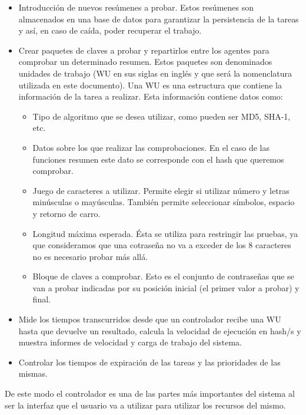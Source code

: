 \begin{itemize}
	\item Introducción de nuevos resúmenes a probar. Estos resúmenes son almacenados en una base de datos para garantizar la persistencia de la tareas y así, en caso de caída, poder recuperar el trabajo.

	\item Crear paquetes de claves a probar y repartirlos entre los agentes para comprobar un determinado resumen. Estos paquetes son denominados unidades de trabajo (WU en sus siglas en inglés y que será la nomenclatura utilizada en este documento). Una WU es una estructura que contiene la información de la tarea a realizar. Esta información contiene datos como:

	\begin{itemize}
		\item Tipo de algoritmo que se desea utilizar, como pueden ser MD5, SHA-1, etc.
	
		\item Datos sobre los que realizar las comprobaciones. En el caso de las funciones resumen este dato se corresponde con el hash que queremos comprobar.
	
		\item Juego de caracteres a utilizar. Permite elegir si utilizar número y letras minúsculas o mayúsculas. También permite seleccionar símbolos, espacio y retorno de carro.
	
		\item Longitud máxima esperada. Ésta se utiliza para restringir las pruebas, ya que consideramos que una cotraseña no va a exceder de los 8 caracteres no es necesario probar más allá.
	
		\item Bloque de claves a comprobar. Esto es el conjunto de contraseñas que se van a probar indicadas por su posición inicial (el primer valor a probar) y final.
	\end{itemize}
	
	\item Mide los tiempos transcurridos desde que un controlador recibe una WU hasta que devuelve un resultado, calcula la velocidad de ejecución en hash/s y muestra informes de velocidad y carga de trabajo del sistema.
	
	\item Controlar los tiempos de expiración de las tareas y las prioridades de las mismas.
\end{itemize}

De este modo el controlador es una de las partes más importantes del sistema al ser la interfaz que el usuario va a utilizar para utilizar los recursos del mismo.

